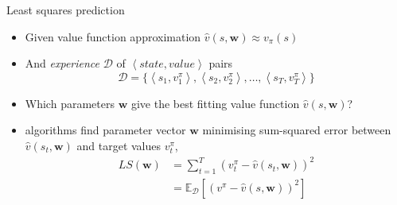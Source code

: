 \bgroup
\begin{frame}{Least squares prediction}
\begin{itemize}
\item Given value function approximation $\hat{v}(s,\textbf{w})\approx v_{\pi}(s)$
\item And \emph{experience} $\mathcal{D}$ of $\left<state,value\right>$ pairs
\begin{equation*}
\mathcal{D}=\{\left<s_1,v_1^{\pi}\right>,
\left<s_2,v_2^{\pi}\right>,
\ldots,
\left<s_T,v_T^{\pi}\right>\}
\end{equation*}
%
\item Which parameters $\textbf{w}$ give the best fitting value function $\hat{v}(s, \textbf{w})$?
\item {} algorithms find parameter vector $\textbf{w}$ minimising sum-squared error between $\hat{v}(s_t,\textbf{w})$ and target values $v_t^{\pi}$,
\begin{align*}
LS(\textbf{w})&=\sum_{t=1}^T(v_t^{\pi} - \hat{v}(s_t,\textbf{w}))^2\\
&=\mathbb{E}_{\mathcal{D}}[(v^{\pi} - \hat{v}(s,\textbf{w}))^2]
\end{align*}
\end{itemize}
\end{frame}
\egroup